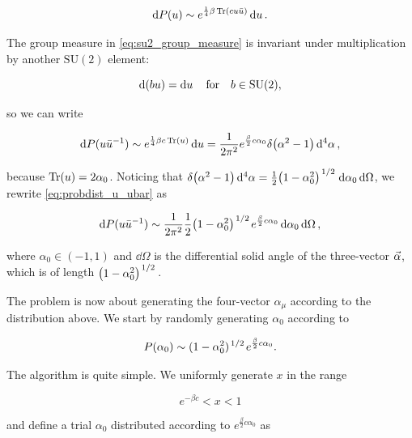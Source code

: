 \documentclass[reqno,12pt]{article}
\numberwithin{equation}{section}
\newcommand{\SU}{\mathrm{SU}}
\begin{document}
\begin{equation}
	\dd{P(u)} \sim e^{\frac{1}{4}\beta\Tr(c u \bar{u})} \dd{u}.
\end{equation}

The group measure in \eqref{eq:su2_group_measure} is invariant under multiplication by another $\SU(2)$ element:

\begin{equation}
	\dd(b u) = \dd{u} \qfor b \in \SU(2),
\end{equation}

so we can write

\begin{equation} \label{eq:probdist_u_ubar}
	\dd{P(u \bar{u}^{-1})} \sim e^{\frac{1}{4}\beta c \Tr(u)} \dd{u} 
	= \frac{1}{2\pi^2} e^{\frac{\beta}{2}c \alpha_0} \delta\qty(\alpha^2 - 1) \dd[4]{\alpha},
\end{equation}

because $\Tr(u) = 2\alpha_0$. Noticing that $\delta\qty(\alpha^2 - 1)\dd[4]{\alpha} = 
\frac{1}{2}\qty(1 - \alpha_0^2)^{\flatfrac{1}{2}} \dd{\alpha_0}\dd{\Omega}$, we rewrite \eqref{eq:probdist_u_ubar} as

\begin{equation}
	\dd{P(u \bar{u}^{-1})} \sim 
	\frac{1}{2\pi^2} \frac{1}{2}\qty(1 - \alpha_0^2)^{\flatfrac{1}{2}} e^{\frac{\beta}{2}c \alpha_0} \dd{\alpha_0}\dd{\Omega},
\end{equation}

where $\alpha_0 \in (-1,1)$ and $\dd{\Omega}$ is the differential solid angle of the three-vector $\va{\alpha}$,
which is of length $\qty(1 - \alpha_0^2)^{\flatfrac{1}{2}}$.

The problem is now about generating the four-vector $\alpha_\mu$ according to the distribution above.
We start by randomly generating $\alpha_0$ according to

\begin{equation} \label{eq:probdistalpha}
	P(\alpha_0) \sim (1 - \alpha_0^2)^{\flatfrac{1}{2}} e^{\frac{\beta}{2}c\alpha_0}.
\end{equation}

The algorithm is quite simple. We uniformly generate $x$ in the range 

\begin{equation}
	e^{-\beta c} < x < 1
\end{equation} 

and define a trial $\alpha_0$ distributed according to $e^{\frac{\beta}{2}c\alpha_0}$ as
\end{document}
